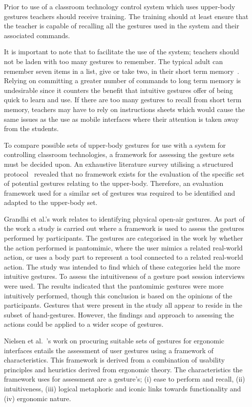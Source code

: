 \documentclass[link]{IWCOMP}
\begin{document}
Prior to use of a classroom technology control system which uses upper-body gestures teachers should receive training.
The training should at least ensure that the teacher is capable of recalling all the gestures used in the system and their associated commands.

It is important to note that to facilitate the use of the system; teachers should not be laden with too many gestures to remember.
The typical adult can remember seven items in a list, give or take two, in their short term memory~\cite{mil56}.
Relying on committing a greater number of commands to long term memory is undesirable since it counters the benefit that intuitive gestures offer of being quick to learn and use.
If there are too many gestures to recall from short term memory, teachers may have to rely on instructions sheets which would cause the same issues as the use as mobile interfaces where their attention is taken away from the students.

To compare possible sets of upper-body gestures for use with a system for controlling classroom technologies, a framework for assessing the gesture sets must be decided upon.
An exhaustive literature survey utilising a structured protocol~\cite{kitchenham04} revealed that no framework exists for the evaluation of the specific set of potential gestures relating to the upper-body.
Therefore, an evaluation framework used for a similar set of gestures was required to be identified and adapted to the upper-body set.

Grandhi et al.'s \citeyearpar{Grandhi2011} work relates to identifying physical open-air gestures.
As part of the work a study is carried out where a framework is used to assess the gestures performed by participants.
The gestures are categorised in the work by whether the action performed is pantomimic, where the user mimics a related real-world action, or uses a body part to represent a tool connected to a related real-world action.
The study was intended to find which of these categories held the more intuitive gestures.
To assess the intuitiveness of a gesture post session interviews were used.
The results indicated that the pantomimic gestures were more intuitively performed, though this conclusion is based on the opinions of the participants.
Gestures that were present in the study all appear to reside in the subset of hand-gestures.
However, the findings and approach to assessing the actions could be applied to a wider scope of gestures.

Nielsen et al.~\citeyearpar{Nielsen2004}'s work on procuring suitable sets of gestures for ergonomic interfaces entails the assessment of user gestures using a framework of characteristics.
This framework is derived from a combination of usability principles and heuristics derived from ergonomic theory.
The characteristics the framework uses for assessment are a gesture's; (i) ease to perform and recall, (ii) intuitiveness, (iii) logical metaphoric and iconic links towards functionality and (iv) ergonomic nature.
\end{document}
